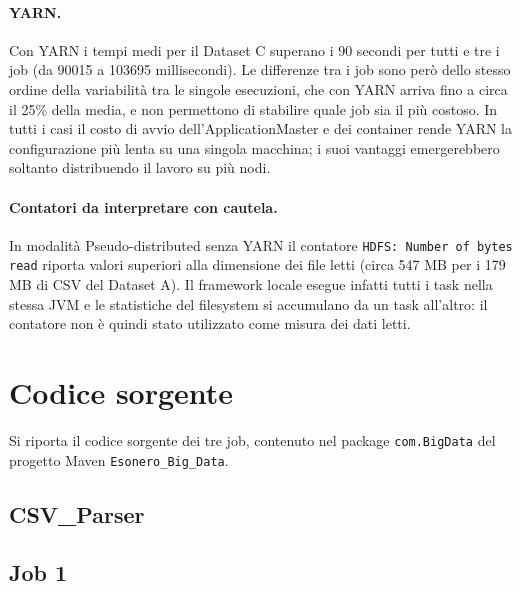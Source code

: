 \documentclass[12pt, a4paper]{article}
\begin{document}
\paragraph{YARN.}
Con YARN i tempi medi per il Dataset C superano
i 90 secondi per tutti e tre i job (da 90015
a 103695 millisecondi). Le differenze tra i job sono
però dello stesso ordine della variabilità tra le singole
esecuzioni, che con YARN arriva fino a circa il 25\%
della media, e non permettono di stabilire quale job
sia il più costoso.
In tutti i casi il costo di avvio dell'ApplicationMaster
e dei container rende YARN la configurazione più lenta
su una singola macchina; i suoi vantaggi emergerebbero
soltanto distribuendo il lavoro su più nodi.

\paragraph{Contatori da interpretare con cautela.}
In modalità Pseudo-distributed senza YARN il contatore
\texttt{HDFS: Number of bytes read} riporta valori superiori
alla dimensione dei file letti (circa 547 MB per i 179 MB
di CSV del Dataset A). Il framework locale esegue infatti
tutti i task nella stessa JVM e le statistiche del filesystem
si accumulano da un task all'altro: il contatore non è quindi
stato utilizzato come misura dei dati letti.

\appendix

\section{Codice sorgente}

Si riporta il codice sorgente dei tre job, contenuto
nel package \texttt{com.BigData} del progetto Maven
\texttt{Esonero\_Big\_Data}.

\subsection{CSV\_Parser}


\subsection{Job 1}



\end{document}
